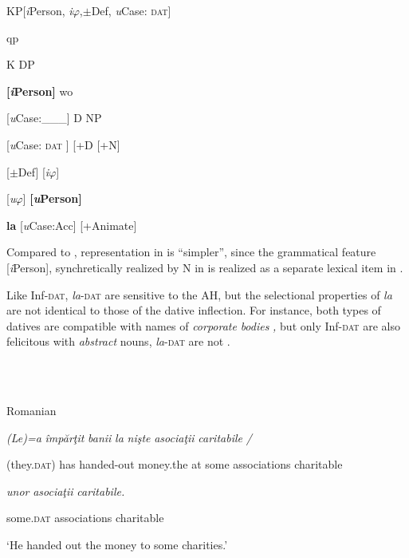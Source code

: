 \documentclass[output=paper,modfonts,nonflat]{langsci/langscibook}
\begin{document}
            

KP[\textit{i}Person, \textit{i}${\varphi}$,${\pm}$Def, \textit{u}Case: \textsc{dat}]

qp

  K            DP

\textbf{[\textit{i}}\textbf{Person]}       wo

  [\textit{u}Case:\_\_\_]    D    NP

   [\textit{u}Case: \textsc{dat} ]  [+D    [+N]

    {\textbar}    [${\pm}$Def]  [\textit{i}${\varphi}$]

    {\textbar}    [\textit{u}${\varphi}$]    \textbf{[\textit{u}}\textbf{Person]}

    \textbf{la}    [\textit{u}Case:Acc]  [+Animate]

Compared to , representation in  is “simpler”, since the grammatical feature [\textit{i}Person], synchretically realized by N in  is realized as a separate lexical item in . 

Like Inf-\textsc{dat}, \textit{la}{}-\textsc{dat} are sensitive to the AH, but the selectional properties of \textit{la} are not identical to those of the dative inflection. For instance, both types of datives are compatible with names of \textit{corporate} \textit{bodies} \textit{,} but only Inf-\textsc{dat} are also felicitous with \textit{abstract} nouns, \textit{la}{}-\textsc{dat} are not .

\ea%
    \label{ex:key:18}
    \gll\\
        \\
    \glt
    \z

          Romanian

\textit{(Le)=a}   \textit{împărţit}    \textit{banii}  \textit{la} \textit{nişte}    \textit{asociaţii} \textit{caritabile} \textit{/}

  (they.\textsc{dat}) has handed-out  money.the at some    associations charitable

  \textit{unor}    \textit{asociaţii}  \textit{caritabile.}

some.\textsc{dat}  associations   charitable

  ‘He handed out the money to some charities.’

\ea%
    \label{ex:key:19}
    \gll\\
        \\
    \glt
    \z
\end{document}
